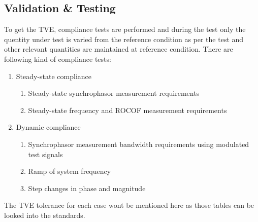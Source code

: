 \subsection{Validation \& Testing }
To get the TVE, compliance tests are performed and during the test only the quentity under test is varied from the reference condition as per the test and other relevant quantities are maintained at reference condition. There are following kind of compliance tests:
\begin{enumerate}
\item Steady-state compliance
	\begin{enumerate}
	\item Steady-state synchrophasor measurement requirements
	\item Steady-state frequency and ROCOF measurement requirements
	\end{enumerate}
\item Dynamic compliance
	\begin{enumerate}
	\item Synchrophasor measurement bandwidth requirements using modulated test signals
	\item Ramp of system frequency
	\item Step changes in phase and magnitude
	\end{enumerate}
\end{enumerate} 
The TVE tolerance for each case wont be mentioned here as those tables can be looked into the standards.

